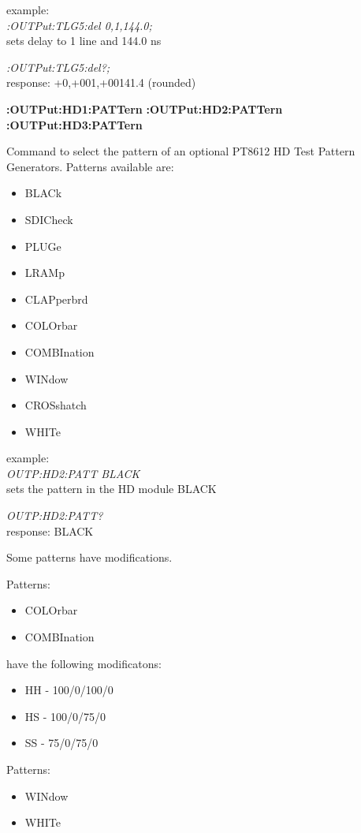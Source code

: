 example:\\
\textit{:OUTPut:TLG5:del 0,1,144.0;}\\
sets delay to 1 line and 144.0 ns

\textit{:OUTPut:TLG5:del?;}\\
response: +0,+001,+00141.4 (rounded)

\textbf{:OUTPut:HD1:PATTern}
\textbf{:OUTPut:HD2:PATTern}
\textbf{:OUTPut:HD3:PATTern}

Command to select the pattern of an optional PT8612 HD Test Pattern Generators. Patterns available are:
 
\begin{itemize}
\item BLACk
\item SDICheck
\item PLUGe
\item LRAMp
\item CLAPperbrd
\item COLOrbar
\item COMBInation
\item WINdow
\item CROSshatch
\item WHITe
\end{itemize}

example:\\
\textit{OUTP:HD2:PATT BLACK}\\
sets the pattern in the HD module BLACK

\textit{OUTP:HD2:PATT?}\\
response: BLACK

Some patterns have modifications.

Patterns:

\begin{itemize}
\item COLOrbar
\item COMBInation
\end{itemize}

have the following modificatons:

\begin{itemize}
\item HH  - 100/0/100/0
\item HS  - 100/0/75/0
\item SS  - 75/0/75/0
\end{itemize}

Patterns:

\begin{itemize}
\item WINdow
\item WHITe
\end{itemize}

